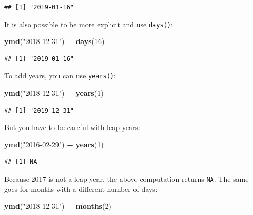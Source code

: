 \documentclass[]{gitbook}
\newenvironment{Shaded}{\begin{snugshade}}{\end{snugshade}}
\newcommand{\DecValTok}[1]{\textcolor[rgb]{0.00,0.00,0.81}{#1}}
\newcommand{\KeywordTok}[1]{\textcolor[rgb]{0.13,0.29,0.53}{\textbf{#1}}}
\newcommand{\NormalTok}[1]{#1}
\newcommand{\OperatorTok}[1]{\textcolor[rgb]{0.81,0.36,0.00}{\textbf{#1}}}
\newcommand{\StringTok}[1]{\textcolor[rgb]{0.31,0.60,0.02}{#1}}
\begin{document}
\begin{verbatim}
## [1] "2019-01-16"
\end{verbatim}

It is also possible to be more explicit and use \texttt{days()}:

\begin{Shaded}
\begin{Highlighting}[]
\KeywordTok{ymd}\NormalTok{(}\StringTok{"2018-12-31"}\NormalTok{) }\OperatorTok{+}\StringTok{ }\KeywordTok{days}\NormalTok{(}\DecValTok{16}\NormalTok{)}
\end{Highlighting}
\end{Shaded}

\begin{verbatim}
## [1] "2019-01-16"
\end{verbatim}

To add years, you can use \texttt{years()}:

\begin{Shaded}
\begin{Highlighting}[]
\KeywordTok{ymd}\NormalTok{(}\StringTok{"2018-12-31"}\NormalTok{) }\OperatorTok{+}\StringTok{ }\KeywordTok{years}\NormalTok{(}\DecValTok{1}\NormalTok{)}
\end{Highlighting}
\end{Shaded}

\begin{verbatim}
## [1] "2019-12-31"
\end{verbatim}

But you have to be careful with leap years:

\begin{Shaded}
\begin{Highlighting}[]
\KeywordTok{ymd}\NormalTok{(}\StringTok{"2016-02-29"}\NormalTok{) }\OperatorTok{+}\StringTok{ }\KeywordTok{years}\NormalTok{(}\DecValTok{1}\NormalTok{)}
\end{Highlighting}
\end{Shaded}

\begin{verbatim}
## [1] NA
\end{verbatim}

Because 2017 is not a leap year, the above computation returns \texttt{NA}. The same goes for months with
a different number of days:

\begin{Shaded}
\begin{Highlighting}[]
\KeywordTok{ymd}\NormalTok{(}\StringTok{"2018-12-31"}\NormalTok{) }\OperatorTok{+}\StringTok{ }\KeywordTok{months}\NormalTok{(}\DecValTok{2}\NormalTok{)}
\end{Highlighting}
\end{Shaded}
\end{document}
